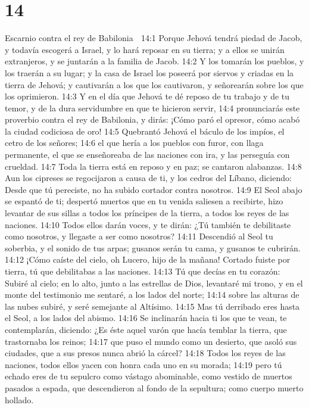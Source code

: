 \chapter{14}

Escarnio contra el rey de Babilonia  

14:1 Porque Jehová tendrá piedad de Jacob, y todavía escogerá a Israel, y lo hará reposar en su tierra; y a ellos se unirán extranjeros, y se juntarán a la familia de Jacob.  
14:2 Y los tomarán los pueblos, y los traerán a su lugar; y la casa de Israel los poseerá por siervos y criadas en la tierra de Jehová; y cautivarán a los que los cautivaron, y señorearán sobre los que los oprimieron.  
14:3 Y en el día que Jehová te dé reposo de tu trabajo y de tu temor, y de la dura servidumbre en que te hicieron servir,  
14:4 pronunciarás este proverbio contra el rey de Babilonia, y dirás: ¡Cómo paró el opresor, cómo acabó la ciudad codiciosa de oro!  
14:5 Quebrantó Jehová el báculo de los impíos, el cetro de los señores;  
14:6 el que hería a los pueblos con furor, con llaga permanente, el que se enseñoreaba de las naciones con ira, y las perseguía con crueldad.  
14:7 Toda la tierra está en reposo y en paz; se cantaron alabanzas.  
14:8 Aun los cipreses se regocijaron a causa de ti, y los cedros del Líbano, diciendo: Desde que tú pereciste, no ha subido cortador contra nosotros.  
14:9 El Seol abajo se espantó de ti; despertó muertos que en tu venida saliesen a recibirte, hizo levantar de sus sillas a todos los príncipes de la tierra, a todos los reyes de las naciones.  
14:10 Todos ellos darán voces, y te dirán: ¿Tú también te debilitaste como nosotros, y llegaste a ser como nosotros?  
14:11 Descendió al Seol tu soberbia, y el sonido de tus arpas; gusanos serán tu cama, y gusanos te cubrirán.  
14:12 ¡Cómo caíste del cielo, oh Lucero, hijo de la mañana! Cortado fuiste por tierra, tú que debilitabas a las naciones.  
14:13 Tú que decías en tu corazón: Subiré al cielo; en lo alto, junto a las estrellas de Dios, levantaré mi trono, y en el monte del testimonio me sentaré, a los lados del norte;  
14:14 sobre las alturas de las nubes subiré, y seré semejante al Altísimo.  
14:15 Mas tú derribado eres hasta el Seol, a los lados del abismo.  
14:16 Se inclinarán hacia ti los que te vean, te contemplarán, diciendo: ¿Es éste aquel varón que hacía temblar la tierra, que trastornaba los reinos;  
14:17 que puso el mundo como un desierto, que asoló sus ciudades, que a sus presos nunca abrió la cárcel?  
14:18 Todos los reyes de las naciones, todos ellos yacen con honra cada uno en su morada;  
14:19 pero tú echado eres de tu sepulcro como vástago abominable, como vestido de muertos pasados a espada, que descendieron al fondo de la sepultura; como cuerpo muerto hollado.  
